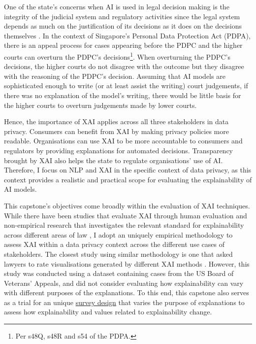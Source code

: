 One of the state's concerns when AI is used in legal decision making is the integrity of the judicial system and regulatory activities since the legal system depends as much on the justification of its decisions as it does on the decisions themselves \cite{chesterman2021_opacity}. In the context of Singapore's Personal Data Protection Act (PDPA), there is an appeal process for cases appearing before the PDPC and the higher courts can overturn the PDPC's decisions\footnote{Per s48Q, s48R and s54 of the PDPA.}. When overturning the PDPC's decisions, the higher courts do not disagree with the outcome but they disagree with the reasoning of the PDPC's decision. Assuming that AI models are sophisticated enough to write (or at least assist the writing) court judgements, if there was no explanation of the model's writing, there would be little basis for the higher courts to overturn judgements made by lower courts. 

Hence, the importance of XAI applies across all three stakeholders in data privacy. Consumers can benefit from XAI by making privacy policies more readable. Organisations can use XAI to be more accountable to consumers and regulators by providing explanations for automated decisions. Transparency brought by XAI also helps the state to regulate organisations' use of AI. Therefore, I focus on NLP and XAI in the specific context of data privacy, as this context provides a realistic and practical scope for evaluating the explainability of AI models.

This capstone's objectives come broadly within the evaluation of XAI techniques. While there have been studies that evaluate XAI through human evaluation \cite{vilone2021} and non-empirical research that investigates the relevant standard for explainability across different areas of law \cite{hacker2022varieties}, I adopt an uniquely empirical methodology to assess XAI within a data privacy context across the different use cases of stakeholders. The closest study using similar methodology is one that asked lawyers to rate visualisations generated by different XAI methods \cite{gorski2021}. However, this study was conducted using a dataset containing cases from the US Board of Veterans' Appeals, and did not consider evaluating how explainability can vary with different purposes of the explanations. To this end, this capstone also serves as a trial for an unique \hyperref[sec:survey_method]{survey design} that varies the purpose of explanations to assess how explainability and values related to explainability change.

